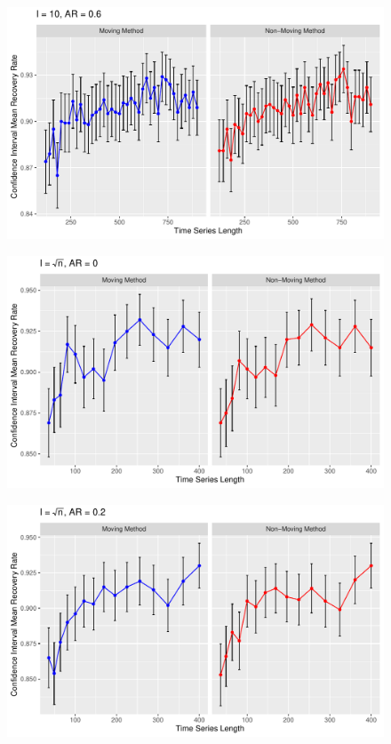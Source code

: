 \documentclass[12pt, letterpaper, titlepage]{article}
\begin{document}
\begin{figure}[tbp]
  \centering
  \includegraphics[width=\textwidth]{constant_0.6}
  \caption{}
  \label{fig:constant_0.6}
\end{figure}

\begin{figure}[tbp]
  \centering
  \includegraphics[width=\textwidth]{root_0}
  \caption{}
  \label{fig:root_0}
\end{figure}

\begin{figure}[tbp]
  \centering
  \includegraphics[width=\textwidth]{root_0.2}
  \caption{}
  \label{fig:root_0.2}
\end{figure}
\end{document}
